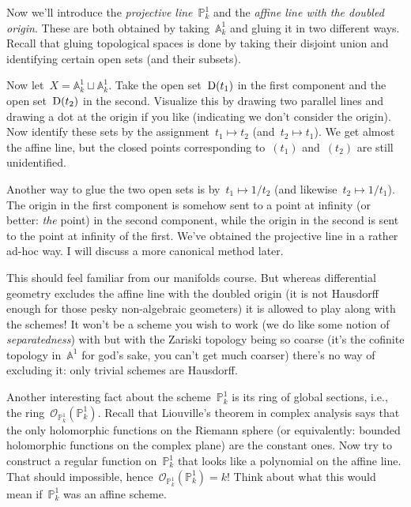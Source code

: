\begin{example}
  \label{example:projective-line-doubled-origin}
  Now we'll introduce the \emph{projective line}~$\mathbb{P}^1_k$ and the \emph{affine line with the doubled origin}. These are both obtained by taking~$\mathbb{A}^1_k$ and gluing it in two different ways. Recall that gluing topological spaces is done by taking their disjoint union and identifying certain open sets (and their subsets).

  Now let~$X=\mathbb{A}^1_k\sqcup\mathbb{A}^1_k$. Take the open set~$\operatorname{D}(t_1)$ in the first component and the open set~$\operatorname{D}(t_2)$ in the second. Visualize this by drawing two parallel lines and drawing a dot at the origin if you like (indicating we don't consider the origin). Now identify these sets by the assignment~$t_1\mapsto t_2$ (and~$t_2\mapsto t_1$). We get almost the affine line, but the closed points corresponding to~$(t_1)$ and~$(t_2)$ are still unidentified.

  Another way to glue the two open sets is by~$t_1\mapsto 1/t_2$ (and likewise~$t_2\mapsto 1/t_1$). The origin in the first component is somehow sent to a point at infinity (or better: \emph{the} point) in the second component, while the origin in the second is sent to the point at infinity of the first. We've obtained the projective line in a rather ad-hoc way. I will discuss a more canonical method later.

  This should feel familiar from our manifolds course. But whereas differential geometry excludes the affine line with the doubled origin (it is not Hausdorff enough for those pesky non-algebraic geometers) it is allowed to play along with the schemes! It won't be a scheme you wish to work (we do like some notion of \emph{separatedness}) with but with the Zariski topology being so coarse (it's the cofinite topology in~$\mathbb{A}^1$ for god's sake, you can't get much coarser) there's no way of excluding it: only trivial schemes are Hausdorff.

  Another interesting fact about the scheme~$\mathbb{P}^1_k$ is its ring of global sections, i.e., the ring~$\mathcal{O}_{\mathbb{P}^1_k}(\mathbb{P}^1_k)$. Recall that Liouville's theorem in complex analysis says that the only holomorphic functions on the Riemann sphere (or equivalently: bounded holomorphic functions on the complex plane) are the constant ones. Now try to construct a regular function on~$\mathbb{P}^1_k$ that looks like a polynomial on the affine line. That should impossible, hence~$\mathcal{O}_{\mathbb{P}^1_k}(\mathbb{P}^1_k)=k$! Think about what this would mean if~$\mathbb{P}^1_k$ was an affine scheme.
\end{example}

